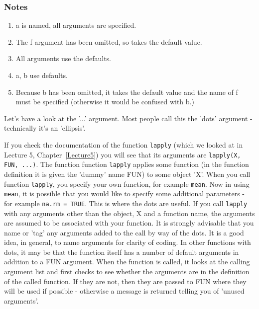 \documentclass[titlepage]{book}\usepackage{knitr}
\begin{document}
\subsubsection{Notes}
\begin{enumerate}
\item{a is named, all arguments are specified.}
\item{The f argument has been omitted, so takes the default value.}
\item{All arguments use the defaults.}
\item{a, b use defaults.}
\item{Because b has been omitted, it takes the default value and the name of f must be specified (otherwise it would be confused with b.)}

\end{enumerate}
Let's have a look at the '...' argument.  Most people call this the 'dots' argument - technically it's an 'ellipsis'. 

If you check the documentation of the function \texttt{lapply} (which we looked at in Lecture 5, Chapter~\ref{Lecture5}) you will see that its arguments are \texttt{lapply(X, FUN, ...)}. The function function \texttt{lapply}  applies some function (in the function definition it is given the 'dummy' name FUN) to some object 'X'. When you call function \texttt{lapply}, you specify your own function, for example \texttt{mean}.  Now in using  \texttt{mean}, it is possible that you would like to specify some additional parameters -  for example  \texttt{na.rm = TRUE}.  This is where the dots are useful. If you call \texttt{lapply} with any arguments other than the object, X and a function name, the arguments are assumed to be associated with your function.  It is strongly advisable that you name or 'tag' any arguments added to the call by way of the dots. It is a good idea, in general, to name arguments for clarity of coding.
In other functions with dots, it may be that the function itself has a number of default arguments in addition to a FUN argument. When the function is called, it looks at the calling argument list and first checks to see whether the arguments are in the definition of the called function. If they are not, then they are passed to FUN where they will be used if possible - otherwise a message is returned telling you of 'unused arguments'.
\end{document}

